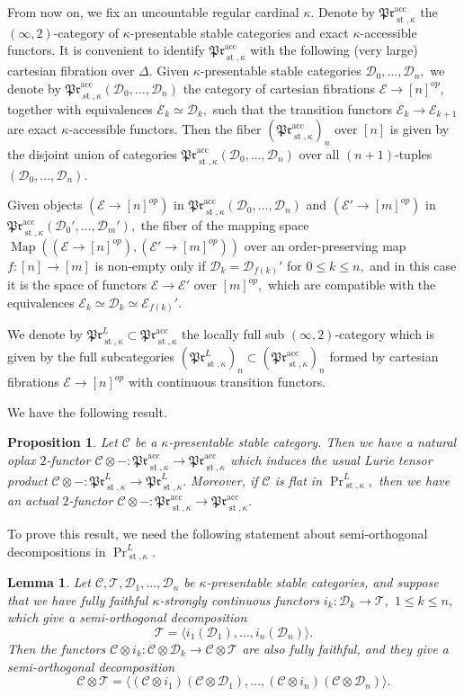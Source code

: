 \documentclass[11pt,leqno]{amsart}
\newtheorem{lemma}[theo]{Lemma}
\newtheorem{prop}[theo]{Proposition}
\numberwithin{equation}{section}
\def\Map{\operatorname{Map}}
\newcommand{\acc}{\operatorname{acc}}
\newcommand{\st}{\operatorname{st}}
\newcommand{\cD}{{\mathcal D}}
\newcommand{\cC}{{\mathcal C}}
\newcommand{\cE}{{\mathcal E}}
\newcommand{\cT}{{\mathcal T}}
\newcommand{\la}{\langle}
\newcommand{\ra}{\rangle}
\newcommand{\mPr}{\mathfrak{Pr}}
\begin{document}
From now on, we fix an uncountable regular cardinal $\kappa.$ Denote by $\mPr^{\acc}_{\st,\kappa}$ the $(\infty,2)$-category of $\kappa$-presentable stable categories and exact $\kappa$-accessible functors. It is convenient to identify $\mPr^{\acc}_{\st,\kappa}$ with the following (very large) cartesian fibration over $\Delta.$ Given $\kappa$-presentable stable categories $\cD_0,\dots,\cD_n,$ we denote by $\mPr^{\acc}_{\st,\kappa}(\cD_0,\dots,\cD_n)$ the category of cartesian fibrations $\cE\to [n]^{op},$ together with equivalences $\cE_k\simeq\cD_k,$ such that the transition functors $\cE_k\to\cE_{k+1}$ are exact $\kappa$-accessible functors. Then the fiber $(\mPr^{\acc}_{\st,\kappa})_n$ over $[n]$ is given by the disjoint union of categories $\mPr^{\acc}_{\st,\kappa}(\cD_0,\dots,\cD_n)$ over all $(n+1)$-tuples $(\cD_0,\dots,\cD_n).$

Given objects $(\cE\to [n]^{op})$ in $\mPr^{\acc}_{\st,\kappa}(\cD_0,\dots,\cD_n)$ and $(\cE'\to [m]^{op})$ in $\mPr^{\acc}_{\st,\kappa}(\cD_0',\dots,\cD_m'),$ the fiber of the mapping space $\Map((\cE\to [n]^{op}),(\cE'\to [m]^{op}))$ over an order-preserving map $f:[n]\to [m]$ is non-empty only if $\cD_k=\cD_{f(k)}'$ for $0\leq k\leq n,$ and in this case it is the space of functors $\cE\to\cE'$ over $[m]^{op},$ which are compatible with the equivalences $\cE_k\simeq\cD_k\simeq\cE_{f(k)}'.$ 

We denote by $\mPr^L_{\st,\kappa}\subset\mPr^{\acc}_{\st,\kappa}$ the locally full sub $(\infty,2)$-category which is given by the full subcategories $(\mPr^L_{\st,\kappa})_n\subset(\mPr^{\acc}_{\st,\kappa})_n$ formed by cartesian fibrations $\cE\to [n]^{op}$ with continuous transition functors.

We have the following result.

\begin{prop}\label{prop:extra_functoriality} Let $\cC$ be a $\kappa$-presentable stable category. Then we have a natural oplax $2$-functor $\cC\otimes-:\mPr^{\acc}_{\st,\kappa}\to \mPr^{\acc}_{\st,\kappa}$ which induces the usual Lurie tensor product $\cC\otimes-:\mPr^L_{\st,\kappa}\to\mPr^L_{\st,\kappa}.$ Moreover, if $\cC$ is flat in $\Pr^L_{\st,\kappa},$ then we have an actual $2$-functor $\cC\otimes-:\mPr^{\acc}_{\st,\kappa}\to \mPr^{\acc}_{\st,\kappa}.$\end{prop}

To prove this result, we need the following statement about semi-orthogonal decompositions in $\Pr^L_{\st,\kappa}.$

\begin{lemma}\label{lem:C_otimes_SOD} Let $\cC,\cT,\cD_1,\dots,\cD_n$ be $\kappa$-presentable stable categories, and suppose that we have fully faithful $\kappa$-strongly continuous functors $i_k:\cD_k\to\cT,$ $1\leq k\leq n,$ which give a semi-orthogonal decomposition
$$\cT=\la i_1(\cD_1),\dots,i_n(\cD_n)\ra.$$
Then the functors $\cC\otimes i_k:\cC\otimes\cD_k\to\cC\otimes\cT$ are also fully faithful, and they give a semi-orthogonal decomposition
$$\cC\otimes\cT=\la (\cC \otimes i_1)(\cC\otimes \cD_1),\dots,(\cC \otimes i_n)(\cC\otimes \cD_n)\ra.$$\end{lemma}
\end{document}

